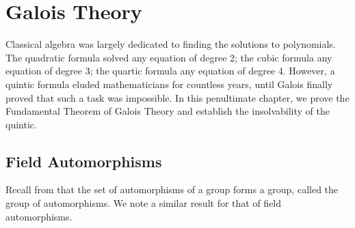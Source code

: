 \chapter{Galois Theory}
Classical algebra was largely dedicated to finding the solutions to polynomials. The quadratic formula solved any equation of degree 2; the cubic formula any equation of degree 3; the quartic formula any equation of degree 4. However, a quintic formula eluded mathematicians for countless years, until Galois finally proved that such a task was impossible. In this penultimate chapter, we prove the Fundamental Theorem of Galois Theory and establish the insolvability of the quintic.

\section{Field Automorphisms}
Recall from  that the set of automorphisms of a group forms a group, called the group of automorphisms. We note a similar result for that of field automorphisms.

